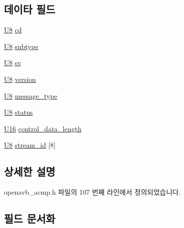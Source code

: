 \subsection*{데이타 필드}
\begin{DoxyCompactItemize}
\item 
\hyperlink{openavb__types__base__pub_8h_aa63ef7b996d5487ce35a5a66601f3e73}{U8} \hyperlink{structopenavb__acmp__control__header__t_ad2828a59ad0b95e77da38333c0a717de}{cd}
\item 
\hyperlink{openavb__types__base__pub_8h_aa63ef7b996d5487ce35a5a66601f3e73}{U8} \hyperlink{structopenavb__acmp__control__header__t_ad61c2796f8f447c2ca8979f4aeccf351}{subtype}
\item 
\hyperlink{openavb__types__base__pub_8h_aa63ef7b996d5487ce35a5a66601f3e73}{U8} \hyperlink{structopenavb__acmp__control__header__t_adc62d14194c9ab3aff5b994caef8bcb0}{sv}
\item 
\hyperlink{openavb__types__base__pub_8h_aa63ef7b996d5487ce35a5a66601f3e73}{U8} \hyperlink{structopenavb__acmp__control__header__t_ae5d1ca2d5099c6a5f760c897505cb11b}{version}
\item 
\hyperlink{openavb__types__base__pub_8h_aa63ef7b996d5487ce35a5a66601f3e73}{U8} \hyperlink{structopenavb__acmp__control__header__t_a5e8953d77df4508aa07ed906c5b19beb}{message\+\_\+type}
\item 
\hyperlink{openavb__types__base__pub_8h_aa63ef7b996d5487ce35a5a66601f3e73}{U8} \hyperlink{structopenavb__acmp__control__header__t_aa2ef32d18f7a5a009b93a17834fe3828}{status}
\item 
\hyperlink{openavb__types__base__pub_8h_a0a0a322d5fa4a546d293a77ba8b4a71f}{U16} \hyperlink{structopenavb__acmp__control__header__t_a6a26fcf01946013b206d67551ef6eb84}{control\+\_\+data\+\_\+length}
\item 
\hyperlink{openavb__types__base__pub_8h_aa63ef7b996d5487ce35a5a66601f3e73}{U8} \hyperlink{structopenavb__acmp__control__header__t_a75d8c196686b96d97e0a271ac7b70da8}{stream\+\_\+id} \mbox{[}8\mbox{]}
\end{DoxyCompactItemize}


\subsection{상세한 설명}


openavb\+\_\+acmp.\+h 파일의 107 번째 라인에서 정의되었습니다.



\subsection{필드 문서화}
